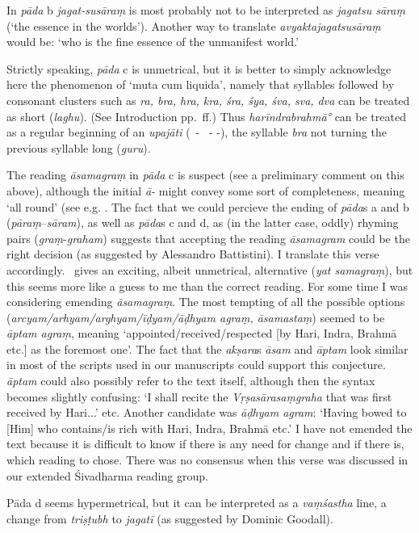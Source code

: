 {{ 
  
 
  In \textit{pāda} b \textit{jagat-susāraṃ} is most probably not 
  to be interpreted as \textit{jagatsu sāraṃ} {\rm (}`the essence in the worlds'{\rm )}.
  Another way to translate \textit{avyaktajagatsusāraṃ} would be: 
  `who is the fine essence of the unmanifest world.'
 
  
 
  Strictly speaking, \textit{pāda} c is unmetrical, but it is better to 
  simply acknowledge here the phenomenon of `muta cum liquida', namely
  that syllables followed by consonant clusters such as 
  \textit{ra, bra, hra, kra, śra, śya, śva, sva, dva} can be treated as short {\rm (}\textit{laghu}{\rm )}.
  {\rm (}See Introduction pp.~\pageref{muta}ff.{\rm )}
  Thus \textit{harīndrabrahmā°} can be treated as a regular beginning
  of an \textit{upajāti} {\rm (}\shortsyllable\ - \shortsyllable\ - -{\rm )}, the syllable 
  \textit{bra} not turning the previous syllable long {\rm (}\textit{guru}{\rm )}.
 
  
 
  The reading \textit{āsamagraṃ} in \textit{pāda} c is suspect 
  {\rm (}see a preliminary comment on this above{\rm )},
  although the initial \textit{ā-} might convey some sort of
  completeness, meaning `all round'
  {\rm (}see e.g. .
  The fact that we could percieve the ending of \textit{pāda}s a and b 
  {\rm (}\textit{pāraṃ}--\textit{sāram}{\rm )}, as well as \textit{pāda}s c and d, as {\rm (}in the 
  latter case, oddly{\rm )} rhyming pairs {\rm (}\textit{graṃ}-\textit{graham}{\rm )}
  suggests that accepting the reading \textit{āsamagram} could be 
  the right decision {\rm (}as suggested by Alessandro Battistini{\rm )}.
  I translate this verse accordingly. \msM\ gives an exciting,
  albeit unmetrical, alternative {\rm (}\textit{yat samagraṃ}{\rm )}, but
  this seems more like a guess to me than the correct reading.
  For some time I was considering emending \textit{āsamagraṃ}.
  The most tempting of all the possible options 
  {\rm (}\textit{arcyam/arhyam/arghyam/īḍyam/āḍhyam agraṃ, āsamastaṃ}{\rm )} 
  seemed to be \textit{āptam agraṃ},
  meaning `appointed/received/respected [by Hari, Indra,
  Brahmā etc.] as the foremost one'. The fact that 
  the \textit{akṣara}s \textit{āsam} and \textit{āptam} look similar in most
  of the scripts used in our manuscripts could support this
  conjecture. \textit{āptam} could also
  possibly refer to the text itself, although then the
  syntax becomes slightly confusing: `I shall recite the
  \textit{Vṛṣasārasaṃgraha} that was first received by Hari...' etc.
  Another candidate was \textit{āḍhyam agram}:
  `Having bowed to [Him] who contains/is rich with Hari, Indra, Brahmā
  etc.' I have not emended the text because it is difficult
  to know if there is any need for change and if there is, which reading 
  to chose. There was no consensus when this verse was discussed 
  in our extended Śivadharma reading group.
 
  
 
  Pāda d seems hypermetrical, but it can be interpreted as a \textit{vaṃśastha}
  line, a change from \textit{triṣṭubh} to \textit{jagatī} {\rm (}as suggested by Dominic Goodall{\rm )}.
 }}

